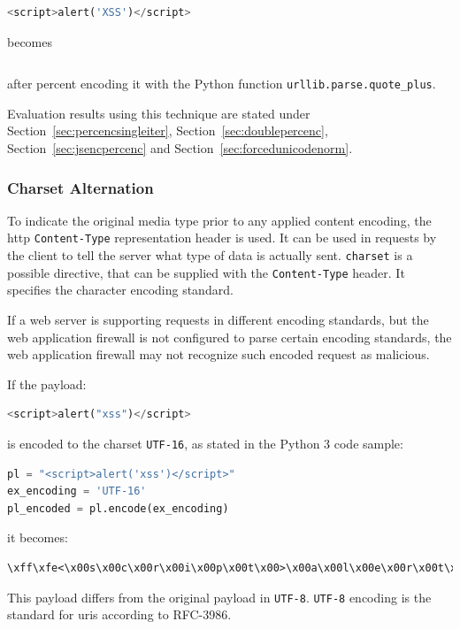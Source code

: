 \begin{lstlisting}[style=basicStyle, language=Python]
<script>alert('XSS')</script>
\end{lstlisting}
becomes

\begin{lstlisting}[style=basicStyle, language=Python]
%3Cscript%3Ealert%28%27XSS%27%29%3C%2Fscript%3E
\end{lstlisting}
after percent encoding it with the Python function \verb|urllib.parse.quote_plus|.

Evaluation results using this technique are stated under Section~\ref{sec:percencsingleiter}, Section~\ref{sec:doublepercenc}, Section~\ref{sec:jsencpercenc} and Section~\ref{sec:forcedunicodenorm}.


\subsubsection{Charset Alternation}
\label{sec:charsetalt}
To indicate the original media type prior to any applied content encoding, the \acrshort{http} \verb|Content-Type| representation header is used.
It can be used in requests by the client to tell the server what type of data is actually sent.
\verb|charset| is a possible directive, that can be supplied with the \verb|Content-Type| header.
It specifies the character encoding standard. \cite{http/contenttype}

If a web server is supporting requests in different encoding standards, but the web application firewall is not configured to parse certain encoding standards, the web application firewall may not recognize such encoded request as malicious.

If the payload:

\begin{lstlisting}[style=basicStyle, language=Python]
<script>alert("xss")</script>
\end{lstlisting}
is encoded to the charset \verb|UTF-16|, as stated in the Python 3 code sample:

\begin{lstlisting}[style=basicStyle, language=Python]
pl = "<script>alert('xss')</script>"
ex_encoding = 'UTF-16'
pl_encoded = pl.encode(ex_encoding)
\end{lstlisting}
it becomes:

\begin{lstlisting}[style=basicStyle]
\xff\xfe<\x00s\x00c\x00r\x00i\x00p\x00t\x00>\x00a\x00l\x00e\x00r\x00t\x00(\x00'\x00x\x00s\x00s\x00'\x00)\x00<\x00/\x00s\x00c\x00r\x00i\x00p\x00t\x00>\x00
\end{lstlisting}
This payload differs from the original payload in \verb|UTF-8|. \verb|UTF-8| encoding is the standard for \acrshort{uri}s according to RFC-3986. \cite{rfc3986}

